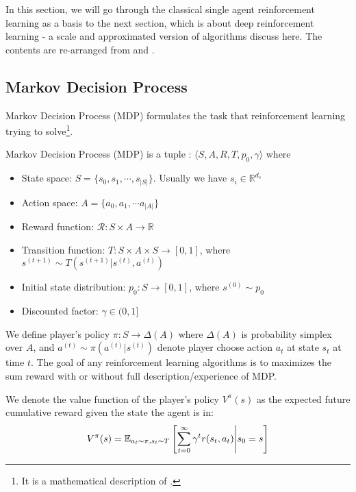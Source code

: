 \label{sec:chap2-single-rl}
In this section, we will go through the classical single agent reinforcement learning as a basis to the next section, which is about deep reinforcement learning - a scale and approximated version of algorithms discuss here. The contents are re-arranged from \cite{sutton2018reinforcement} and \cite{silver}.

\subsection{Markov Decision Process}
\label{sec:chap2-rl-defintions}
Markov Decision Process (MDP) formulates the task that reinforcement learning trying to solve\footnote{It is a mathematical description of .}. 
\begin{definition}
    Markov Decision Process (MDP) is a tuple : $\langle S, A, R, T, p_0, \gamma \rangle$ where 
    \begin{itemize}
        \item State space: $S = \{s_0, s_1, \cdots , s_{|S|}\}$. Usually we have $s_i \in \mathbb{R}^{d_s}$
        \item Action space: $A = \{a_0, a_1, \cdots a_{|A|}\}$
        \item Reward function: $\mathcal{R}: S \times A \rightarrow \mathbb{R}$
        \item Transition function: $T: S \times A \times S \rightarrow [0, 1]$, where $s^{(t+1)} \sim T(s^{(t+1)} | s^{(t)}, a^{(t)})$ 
        \item Initial state distribution: $p_0 : S \rightarrow [0, 1] $, where $s^{(0)} \sim p_0$
        \item Discounted factor: $\gamma \in (0, 1]$
    \end{itemize}
    We define player's policy $\pi: S \rightarrow \Delta(A)$ where $\Delta(A)$ is probability simplex over $A$, and $a^{(t)} \sim \pi(a^{(t)} | s^{(t)})$ denote player choose action $a_t$ at state $s_t$ at time $t$. The goal of any reinforcement learning algorithms is to maximizes the sum reward with or without full description/experience of MDP.
\end{definition}
\noindent
We denote the value function of the player's policy $V^\pi(s)$ as the expected future cumulative reward given the state the agent is in:
\begin{equation}
    V^\pi(s) = \mathbb{E}_{a_t \sim \pi, s_t \sim T}\left[ \sum^\infty_{t=0} \gamma^t r(s_t, a_t) \Bigg| s_0 = s \right]
\end{equation}
